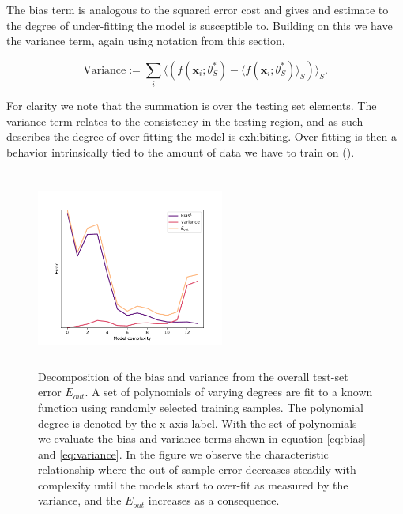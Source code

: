 \noindent The bias term is analogous to the squared error cost and gives and estimate to the degree of under-fitting the model is susceptible to. Building on this we have the variance term, again using notation from this section, 

\begin{equation}\label{eq:variance}
\text{Variance} := \sum_i \langle (f(\mathbf{x}_i; \theta^*_S) - \langle f(\mathbf{x}_i; \theta^*_S) \rangle_S)\rangle_S.
\end{equation}

\noindent For clarity we note that the summation is over the testing set elements. The variance term relates to the consistency in the testing region, and as such describes the degree of over-fitting the model is exhibiting. Over-fitting is then a behavior intrinsically tied to the amount of data we have to train on (\cite{Mehta2019}). 

\begin{figure}
\centering
\includegraphics[width=0.55\textwidth, height=6.5cm]{../figures/bias_var_degree.pdf}
\caption[Bias-variance decomposition ]{Decomposition of the bias and variance from the overall test-set error $E_{out}$. A set of polynomials of varying degrees are fit to a known function using randomly selected training samples. The polynomial degree is denoted by the x-axis label. With the set of polynomials we evaluate the bias and variance terms shown in equation \ref{eq:bias} and \ref{eq:variance}. In the figure we observe the characteristic relationship where the out of sample error decreases steadily with complexity until the models start to over-fit as measured by the variance, and the $E_{out}$ increases as a consequence.}\label{fig:bv}
\end{figure}

